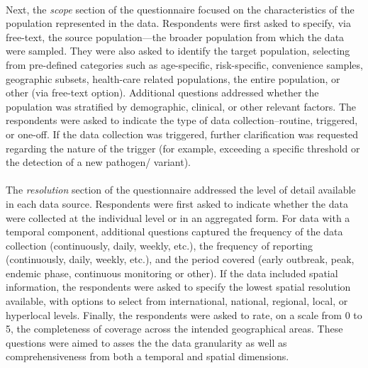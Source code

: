 \documentclass{article}
\begin{document}
\paragraph{}Next, the \textit{scope} section of the questionnaire focused on the characteristics of the population represented in the data. Respondents were first asked to specify, via free-text, the source population---the broader population from which the data were sampled. They were also asked to identify the target population, selecting from pre-defined categories such as age-specific, risk-specific, convenience samples, geographic subsets, health-care related populations, the entire population, or other (via free-text option). Additional questions addressed whether the population was stratified by demographic, clinical, or other relevant factors. The respondents were asked to indicate the type of data collection--routine, triggered, or one-off. If the data collection was triggered, further clarification was requested regarding the nature of the trigger (for example, exceeding a specific threshold or the detection of a new pathogen/ variant). 

\paragraph{}The \textit{resolution} section of the questionnaire addressed the level of detail available in each data source. Respondents were first asked to indicate whether the data were collected at the individual level or in an aggregated form. For data with a temporal component, additional questions captured the frequency of the data collection (continuously, daily, weekly, etc.), the frequency of reporting (continuously, daily, weekly, etc.), and the period covered (early outbreak, peak, endemic phase, continuous monitoring or other). If the data included spatial information, the respondents were asked to specify the lowest spatial resolution available, with options to select from international, national, regional, local, or hyperlocal levels. Finally, the respondents were asked to rate, on a scale from 0 to 5, the completeness of coverage across the intended geographical areas. These questions were aimed to asses the the data granularity as well as comprehensiveness from both a temporal and spatial dimensions. 
\end{document}
